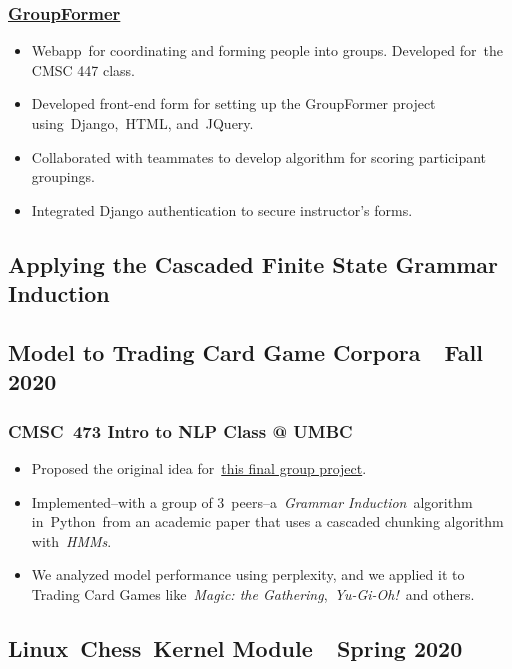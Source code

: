 \documentclass[letterpaper]{article}
\newcommand\textstyleHeadingivChar[1]{\textit{\textcolor[rgb]{0.6784314,0.30980393,0.05882353}{#1}}}
\newcommand\textstyleToolPrimaryChar[1]{\textcolor[rgb]{0.18039216,0.45490196,0.70980394}{#1}}
\newcommand\textstyleHyperlink[1]{\textcolor[rgb]{0.019607844,0.3882353,0.75686276}{#1}}
\newcommand\liststyleLFOi{%
\renewcommand\labelitemi{{}-}
\renewcommand\labelitemii{o}
\renewcommand\labelitemiii{${\blacksquare}$}
\renewcommand\labelitemiv{{\textbullet}}
}
\begin{document}
\subsubsection[GroupFormer]{\href{https://groupformer.herokuapp.com/}{\textstyleHyperlink{GroupFormer}}}
\liststyleLFOi
\begin{itemize}
\item Webapp\ for coordinating and forming people into groups. Developed for\ the CMSC 447 class.
\item Developed front-end form for setting up the GroupFormer project
using\ \textstyleToolPrimaryChar{Django},\ \textstyleToolPrimaryChar{HTML}, and\ \textstyleToolPrimaryChar{JQuery}.
\item Collaborated with teammates to develop algorithm for scoring participant groupings.
\item Integrated Django authentication to secure instructor's forms.
\end{itemize}
\subsection{Applying the Cascaded Finite State Grammar Induction}
\subsection[Model to Trading Card Game Corpora\ \ Fall 2020]{Model to Trading Card Game Corpora\ \ Fall 2020}
\subsubsection[CMSC\ 473 Intro to NLP Class @ UMBC]{CMSC\ 473 Intro to NLP Class @ UMBC}
\liststyleLFOi
\begin{itemize}
\item Proposed the original idea
for\ \href{http://www.kkcoder.net/media/documents/grammar_induction_tcg_cmsc_473_group_final_project.pdf}{\textstyleHyperlink{this
final group project}}.
\item Implemented--with a group of 3\ peers--a\ \textstyleHeadingivChar{Grammar Induction}\ algorithm
in\ \textstyleToolPrimaryChar{Python}\ from an academic paper that uses a cascaded chunking algorithm
with\ \textstyleHeadingivChar{HMMs}.
\item We analyzed model performance using perplexity, and we applied it to Trading Card Games like\ \textit{Magic: the
Gathering},\ \textit{Yu-Gi-Oh!}\ and others.
\end{itemize}
\subsection[Linux\ Chess\ Kernel Module\ \ Spring 2020]{Linux\ Chess\ Kernel Module\ \ Spring 2020}
\end{document}
